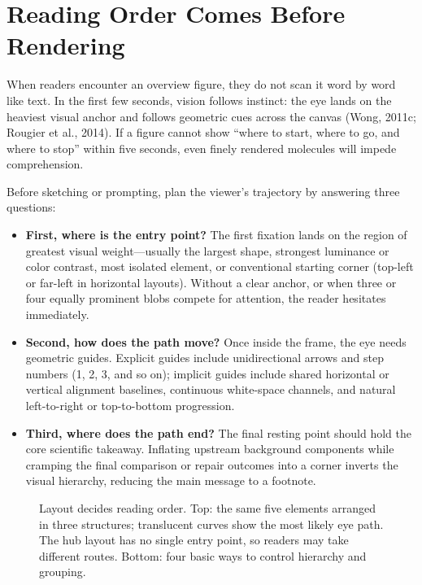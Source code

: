 \section{Reading Order Comes Before Rendering}

When readers encounter an overview figure, they do not scan it word by word like text. In the first few seconds, vision follows instinct: the eye lands on the heaviest visual anchor and follows geometric cues across the canvas (Wong, 2011c; Rougier et al., 2014). If a figure cannot show ``where to start, where to go, and where to stop'' within five seconds, even finely rendered molecules will impede comprehension.

Before sketching or prompting, plan the viewer's trajectory by answering three questions:

\begin{itemize}
\item \textbf{First, where is the entry point?} The first fixation lands on the region of greatest visual weight—usually the largest shape, strongest luminance or color contrast, most isolated element, or conventional starting corner (top-left or far-left in horizontal layouts). Without a clear anchor, or when three or four equally prominent blobs compete for attention, the reader hesitates immediately.
\item \textbf{Second, how does the path move?} Once inside the frame, the eye needs geometric guides. Explicit guides include unidirectional arrows and step numbers (1, 2, 3, and so on); implicit guides include shared horizontal or vertical alignment baselines, continuous white-space channels, and natural left-to-right or top-to-bottom progression.
\item \textbf{Third, where does the path end?} The final resting point should hold the core scientific takeaway. Inflating upstream background components while cramping the final comparison or repair outcomes into a corner inverts the visual hierarchy, reducing the main message to a footnote.
\end{itemize}

\begin{figure}[htbp]\centering
\resizebox{\linewidth}{!}{}
\caption{Layout decides reading order. Top: the same five elements arranged in three structures; translucent curves show the most likely eye path. The hub layout has no single entry point, so readers may take different routes. Bottom: four basic ways to control hierarchy and grouping.}\label{fig:ch03-01}
\end{figure}

